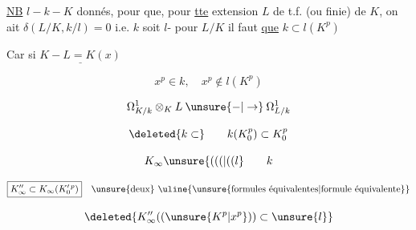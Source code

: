 
\uline{NB} $l-k-K$ donnés, pour que, pour \uline{tte} extension $L$ de t.f. (ou finie) de $K$, on ait  $\delta(L/K,k/l)=0$ i.e. $k$ soit $l$- pour $L/K$ il faut \uline{ que} $k\subset l(K^p)$ 

Car si $\underline{K-L=K(x)}$

\[
x^p\in k,\quad x^p\notin l(K^p)
\]



\[
\Omega^1_{K/k}\otimes_K L \mathbin{\unsure{-|\to}}\Omega^1_{L/k}
\]


\[
\deleted{k\subset}\qquad k(K_0^p)\subset K_0^p
\]

\[
K_\infty\unsure{(((|((l}\qquad k
\]

\[
\boxed{K''_\infty\subset K_\infty(K_0'{}^p)}\quad\text{\unsure{deux} \uline{\unsure{formules équivalentes|formule équivalente}}}
\]

\[
\deleted{K''_\infty((\unsure{K^p|x^p}))\subset\unsure{l}}
\]
